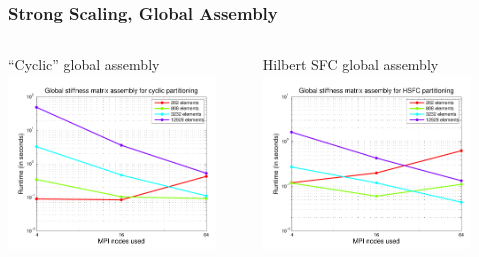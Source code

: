 \documentclass[mathserif]{beamer}
\begin{document}
\begin{frame}
\frametitle{Strong Scaling, Global Assembly}
\begin{columns}[c]
\begin{column}{5.5cm}
\begin{block}{``Cyclic'' global assembly}
\includegraphics[width=5.5cm]{../figs/scalingFigs/cyclicStrongScalingAssembly.pdf}
\end{block}
\end{column}
\begin{column}{5.5cm}
\begin{block}{Hilbert SFC global assembly}
\includegraphics[width=5.5cm]{../figs/scalingFigs/hsfcStrongScalingAssembly.pdf}
\end{block}
\end{column}
\end{columns}
\end{frame}
\end{document}
